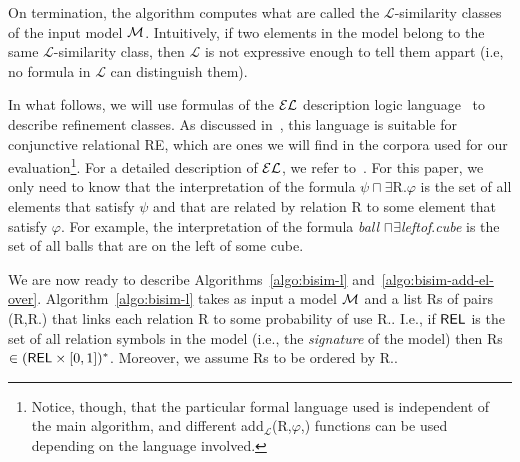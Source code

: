 On termination, the algorithm computes what are called the $\mathcal{L}$-similarity classes of the input model $\mathcal{M}$. Intuitively, if two elements in the model belong to the same $\mathcal{L}$-similarity class, then $\mathcal{L}$ is not expressive enough to tell them appart (i.e, no formula in $\mathcal{L}$ can distinguish them). 

In what follows, we will use formulas of the $\mathcal{EL}$ description logic language~\cite{baad:desc03} to describe refinement classes.  As discussed in~\cite{arec2:2008:Areces}, this language is suitable for conjunctive relational RE, which are ones we will find in the corpora used for our evaluation\footnote{Notice, though, that the particular formal language used is independent of the main algorithm, and different add$_{\mathcal{L}}$(R,$\varphi$,\RE) functions can be used depending on the language involved.}. For a detailed description of $\mathcal{EL}$, we refer to~\cite{baad:desc03}.  For this paper, we only need to know that the interpretation of the formula $\psi \sqcap \exists$R.$\varphi$ is the set of all elements that satisfy $\psi$ and that are related by relation R to some element that satisfy $\varphi$. For example, the interpretation of the formula \emph{ball} $\sqcap \exists$\emph{leftof}.\emph{cube} is the set of all balls that are on the left of some cube.  

We are now ready to describe Algorithms~\ref{algo:bisim-l} and~\ref{algo:bisim-add-el-over}. Algorithm~\ref{algo:bisim-l} takes as input a model $\mathcal{M}$ and a list Rs of pairs (R,R.\puse) that links each relation R to some probability of use R.\puse. I.e., if $\textsf{REL}$ is the set of all relation symbols in the model (i.e., the \emph{signature} of the model) then Rs $\in (\textsf{REL} \times [0,1])^*$. Moreover, we assume Rs to be ordered by R.\puse. 

